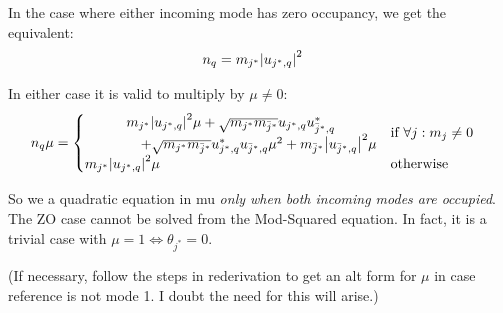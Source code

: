 \documentclass[
	english,
	a4paper,
	fontsize=10pt,
	parskip=half,
	titlepage=true,
	DIV=12,
	final
]{scrreprt}
\begin{document}
In the case where either incoming mode has zero occupancy, we get the equivalent:
\begin{align}
	n_q
&=
	m_{j^*} \abs{u_{j^*, q}}^2
\end{align}

In either case it is valid to multiply by $\mu \neq 0$:
\begin{align}
	n_q \mu
&=
	\begin{cases}
		\mqty{
			  m_{j^*} \abs{u_{j^*, q}}^2 \mu
			+ \sqrt{m_{j^*} m_{\bar{j}^*}} u_{j^*, q}   u_{\bar{j}^*, q}^*
			\\
			\qquad\qquad
			+ \sqrt{m_{j^*} m_{\bar{j}^*}} u_{j^*, q}^* u_{\bar{j}^*, q}   \mu^2
			+ m_{\bar{j}^*} \abs{u_{\bar{j}^*, q}}^2                       \mu
		}
		&
		\text{if } \forall j : m_j \neq 0
	\\
		m_{j^*} \abs{u_{j^*, q}}^2 \mu
		&
		\text{otherwise}
	\end{cases}
\end{align}

So we a quadratic equation in mu \emph{only when both incoming modes are occupied}. The ZO case cannot be solved from the Mod-Squared equation. In fact, it is a trivial case with $\mu = 1 \Leftrightarrow \theta_{j^*} = 0$.

{\color{blue} (If necessary, follow the steps in rederivation to get an alt form for $\mu$ in case reference is not mode 1. I doubt the need for this will arise.)}
\end{document}
